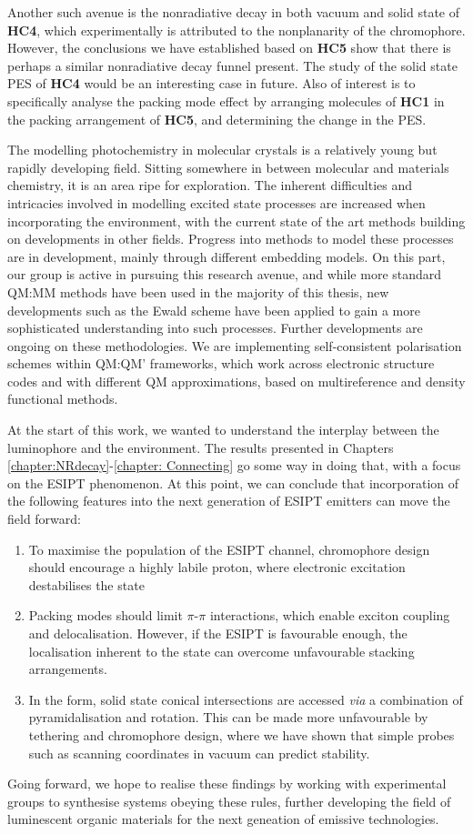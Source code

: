 Another such avenue is the nonradiative decay in both vacuum and solid state of \textbf{HC4}, which experimentally is attributed to the nonplanarity of the chromophore. However, the conclusions we have established based on \textbf{HC5} show that there is perhaps a similar nonradiative decay funnel present. The study of the solid state \ac{PES} of \textbf{HC4} would be an interesting case in future. Also of interest is to specifically analyse the packing mode effect by arranging molecules of \textbf{HC1} in the packing arrangement of \textbf{HC5}, and determining the change in the \ac{PES}. 

The modelling photochemistry in molecular crystals is a relatively young but rapidly developing field. Sitting somewhere in between molecular and materials chemistry, it is an area ripe for exploration. The inherent difficulties and intricacies involved in modelling excited state processes are increased when incorporating the environment, with the current state of the art methods building on developments in other fields. Progress into methods to model these processes are in development, mainly through different embedding models. On this part, our group is active in pursuing this research avenue, and while more standard QM:MM methods have been used in the majority of this thesis, new developments such as the Ewald scheme have been applied to gain a more sophisticated understanding into such processes. Further developments are ongoing on these methodologies. We are implementing self-consistent polarisation schemes within QM:QM' frameworks, which work across electronic structure codes and with different QM approximations, based on multireference and density functional methods.

At the start of this work, we wanted to understand the interplay between the luminophore and the environment. The results presented in Chapters \ref{chapter:NRdecay}-\ref{chapter: Connecting} go some way in doing that, with a focus on the ESIPT phenomenon. At this point, we can conclude that incorporation of the following features into the next generation of ESIPT emitters can move the field forward:
\begin{enumerate}
    \item To maximise the population of the ESIPT channel, chromophore design should encourage a highly labile proton, where electronic excitation destabilises the \Estar{} state
    \item Packing modes should limit $\pi$-$\pi$ interactions, which enable exciton coupling and delocalisation. However, if the ESIPT is favourable enough, the localisation inherent to the \Kstar{} state can overcome unfavourable stacking arrangements.
    \item In the \Kstar{} form, solid state conical intersections are accessed \textit{via} a combination of pyramidalisation and rotation. This can be made more unfavourable by tethering and chromophore design, where we have shown that simple probes such as scanning coordinates in vacuum can predict \Kstar{} stability.
\end{enumerate}

Going forward, we hope to realise these findings by working with experimental groups to synthesise systems obeying these rules, further developing the field of luminescent organic materials for the next geneation of emissive technologies.






